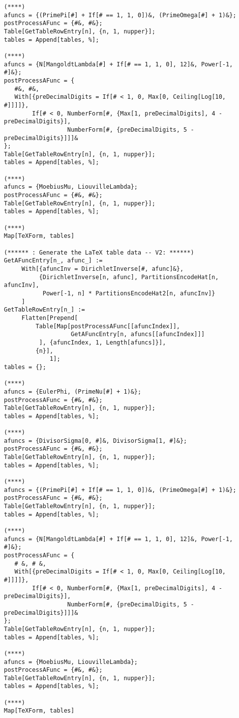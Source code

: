 \documentclass[12pt,reqno,a4letter]{article}
\numberwithin{figure}{section}
\numberwithin{table}{section}
\numberwithin{equation}{section}
\theoremstyle{plain}
\numberwithin{theorem}{section}
\theoremstyle{definition}
\begin{document}
\begin{lstlisting}[caption={Mathematica code for the magic partitions tables}]
(****)
afuncs = {(PrimePi[#] + If[# == 1, 1, 0])&, (PrimeOmega[#] + 1)&};
postProcessAFunc = {#&, #&};
Table[GetTableRowEntry[n], {n, 1, nupper}];
tables = Append[tables, %];

(****)
afuncs = {N[MangoldtLambda[#] + If[# == 1, 1, 0], 12]&, Power[-1, #]&};
postProcessAFunc = {
   #&, #&, 
   With[{preDecimalDigits = If[# < 1, 0, Max[0, Ceiling[Log[10, #]]]]}, 
        If[# < 0, NumberForm[#, {Max[1, preDecimalDigits], 4 - preDecimalDigits}],
                  NumberForm[#, {preDecimalDigits, 5 - preDecimalDigits}]]]&
};
Table[GetTableRowEntry[n], {n, 1, nupper}];
tables = Append[tables, %];

(****)
afuncs = {MoebiusMu, LiouvilleLambda};
postProcessAFunc = {#&, #&};
Table[GetTableRowEntry[n], {n, 1, nupper}];
tables = Append[tables, %];

(****)
Map[TeXForm, tables]

(****** : Generate the LaTeX table data -- V2: ******)
GetAFuncEntry[n_, afunc_] := 
     With[{afuncInv = DirichletInverse[#, afunc]&}, 
          {DirichletInverse[n, afunc], PartitionsEncodeHat[n, afuncInv], 
           Power[-1, n] * PartitionsEncodeHat2[n, afuncInv]}
	 ]
GetTableRowEntry[n_] := 
     Flatten[Prepend[
	     Table[Map[postProcessAFunc[[afuncIndex]], 
	               GetAFuncEntry[n, afuncs[[afuncIndex]]]
		  ], {afuncIndex, 1, Length[afuncs]}], 
	     {n}], 
             1];
tables = {};

(****)
afuncs = {EulerPhi, (PrimeNu[#] + 1)&};
postProcessAFunc = {#&, #&};
Table[GetTableRowEntry[n], {n, 1, nupper}];
tables = Append[tables, %];

(****)
afuncs = {DivisorSigma[0, #]&, DivisorSigma[1, #]&};
postProcessAFunc = {#&, #&};
Table[GetTableRowEntry[n], {n, 1, nupper}];
tables = Append[tables, %];

(****)
afuncs = {(PrimePi[#] + If[# == 1, 1, 0])&, (PrimeOmega[#] + 1)&};
postProcessAFunc = {#&, #&};
Table[GetTableRowEntry[n], {n, 1, nupper}];
tables = Append[tables, %];

(****)
afuncs = {N[MangoldtLambda[#] + If[# == 1, 1, 0], 12]&, Power[-1, #]&};
postProcessAFunc = {
   # &, # &, 
   With[{preDecimalDigits = If[# < 1, 0, Max[0, Ceiling[Log[10, #]]]]}, 
        If[# < 0, NumberForm[#, {Max[1, preDecimalDigits], 4 - preDecimalDigits}],
                  NumberForm[#, {preDecimalDigits, 5 - preDecimalDigits}]]]&
};
Table[GetTableRowEntry[n], {n, 1, nupper}];
tables = Append[tables, %];

(****)
afuncs = {MoebiusMu, LiouvilleLambda};
postProcessAFunc = {#&, #&};
Table[GetTableRowEntry[n], {n, 1, nupper}];
tables = Append[tables, %];

(****)
Map[TeXForm, tables]

\end{lstlisting}
\end{document}

